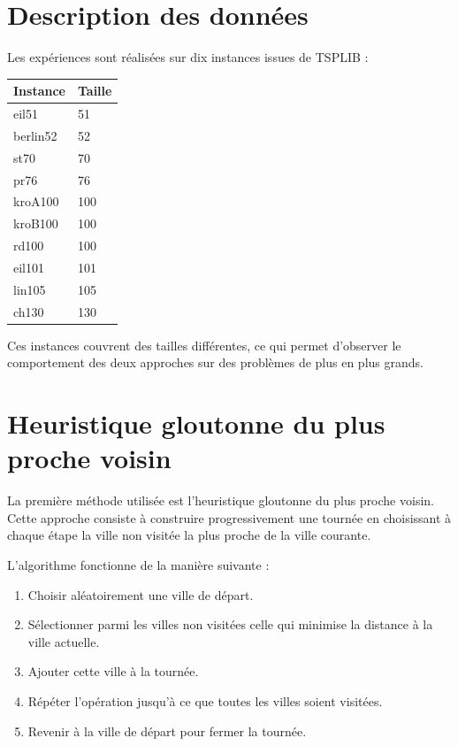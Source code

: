 \documentclass[11pt,a4paper]{article}
\begin{document}
	\section{Description des données}
	Les expériences sont réalisées sur dix instances issues de TSPLIB :
	\begin{center}
		\begin{tabular}{ll}
			\toprule
			Instance & Taille \\
			\midrule
			eil51 & 51 \\
			berlin52 & 52 \\
			st70 & 70 \\
			pr76 & 76 \\
			kroA100 & 100 \\
			kroB100 & 100 \\
			rd100 & 100 \\
			eil101 & 101 \\
			lin105 & 105 \\
			ch130 & 130 \\
			\bottomrule
		\end{tabular}
	\end{center}
	
	Ces instances couvrent des tailles différentes, ce qui permet d'observer le comportement des deux approches sur des problèmes de plus en plus grands.
	
	
	
	\section{Heuristique gloutonne du plus proche voisin}
	
	La première méthode utilisée est l'heuristique gloutonne du plus proche voisin.
	Cette approche consiste à construire progressivement une tournée en choisissant à chaque étape la ville non visitée la plus proche de la ville courante.
	
	L'algorithme fonctionne de la manière suivante :
	\begin{enumerate}
		\item Choisir aléatoirement une ville de départ.
		\item Sélectionner parmi les villes non visitées celle qui minimise la distance à la ville actuelle.
		\item Ajouter cette ville à la tournée.
		\item Répéter l'opération jusqu'à ce que toutes les villes soient visitées.
		\item Revenir à la ville de départ pour fermer la tournée.
	\end{enumerate}
	
\end{document}
